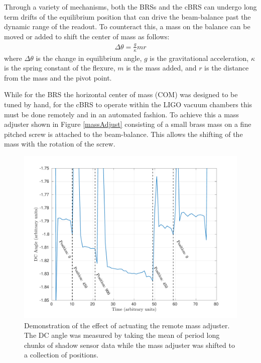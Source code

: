 \documentclass [12pt, proquest]{uwthesis}[2019]
\begin{document}
Through a variety of mechanisms, both the BRSs and the cBRS can undergo long term drifts of the equilibrium position that can drive the beam-balance past the dynamic range of the readout. To counteract this, a mass on the balance can be moved or added to shift the center of mass as follows:
\begin{align}
\Delta \theta=\frac{g}{\kappa} m r
\end{align}
where $\Delta \theta$ is the change in equilibrium angle, $g$ is the gravitational acceleration, $\kappa$ is the spring constant of the flexure, $m$ is the mass added, and $r$ is the distance from the mass and the pivot point.

While for the BRS the horizontal center of mass (COM) was designed to be tuned by hand, for the cBRS to operate within the LIGO vacuum chambers this must be done remotely and in an automated fashion. To achieve this a mass adjuster shown in Figure \ref{massAdjust} consisting of a small brass mass on a fine pitched screw is attached to the beam-balance. This allows the shifting of the mass with the rotation of the screw. 

\begin{figure}[!h]
\begin{center}
\includegraphics[width=\textwidth]{cBRS_massAdjust.pdf}
\end{center}
\caption[Demonstration of the effect of actuating the remote mass adjuster]{Demonstration of the effect of actuating the remote mass adjuster. The DC angle was measured by taking the mean of period long chunks of shadow sensor data while the mass adjuster was shifted to a collection of positions.}\label{massAdjustPlot}
\end{figure}
\end{document}
